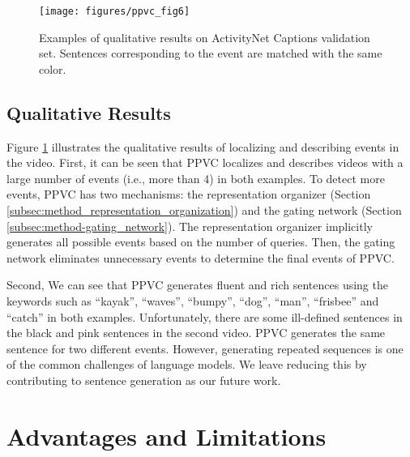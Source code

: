 \begin{figure}
\centering
  \texttt{[image: figures/ppvc\_fig6]}
  \caption{
    Examples of qualitative results on ActivityNet Captions validation set.
    Sentences corresponding to the event are matched with the same color.
  }
  \label{fig:eval_qualitative_results}
\end{figure}


\subsection{Qualitative Results}
\label{subsec:experiments-qual_res}

Figure \ref{fig:eval_qualitative_results} illustrates the qualitative results of localizing and describing events in the video.
First, it can be seen that PPVC localizes and describes videos with a large number of events (i.e., more than 4) in both examples.
To detect more events, PPVC has two mechanisms: the representation organizer (Section \ref{subsec:method_representation_organization}) and the gating network (Section \ref{subsec:method-gating_network}).
The representation organizer implicitly generates all possible events based on the number of queries.
Then, the gating network eliminates unnecessary events to determine the final events of PPVC.

Second, We can see that PPVC generates fluent and rich sentences using the keywords such as ``kayak'', ``waves'', ``bumpy'', ``dog'', ``man'', ``frisbee'' and ``catch'' in both examples.
Unfortunately, there are some ill-defined sentences in the black and pink sentences in the second video.
PPVC generates the same sentence for two different events.
However, generating repeated sequences is one of the common challenges of language models.
We leave reducing this by contributing to sentence generation as our future work.

\section{Advantages and Limitations}
\label{sec:advantages_limitations}

